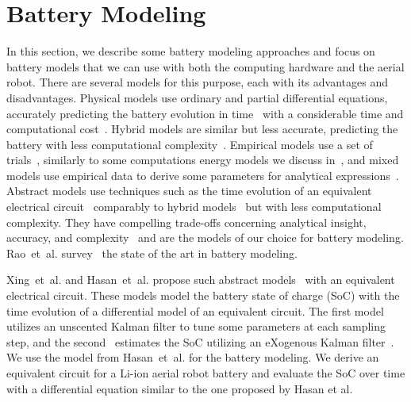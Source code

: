 \section{Battery Modeling}
\label{sec:soa-ene-bat}

In this section, we describe some battery modeling approaches and focus on battery models that we can use with both the computing hardware and the aerial robot. There are several models for this purpose, each with its advantages and disadvantages. Physical models use ordinary and partial differential equations, accurately predicting the battery evolution in time~\citep{rao2003battery} with a considerable time and computational cost~\citep{doyle1993modeling,marcicki2013design,lotfi2017reduced,moura2017battery}. Hybrid models are similar but less accurate, predicting the battery with less computational complexity~\citep{kim2011hybrid,kim2019enhanced}. Empirical models use a set of trials~\citep{syracuse1997statistical,pedram1999design}, similarly to some computations energy models we discuss in~, and mixed models use empirical data to derive some parameters for analytical expressions~\citep{rao2003battery,rakhmatov2001analytical}. Abstract models use techniques such as the time evolution of an equivalent electrical circuit~\citep{gold1997pspice,benini2001discrete,seongjun2008state,xiaosong2012comparative,xing2014state,hasan2018exogenous} comparably to hybrid models~\citep{kim2011hybrid} but with less computational complexity. They have compelling trade-offs concerning analytical insight, accuracy, and complexity~\citep{rao2003battery} and are the models of our choice for battery modeling. Rao~et~al. survey~\citep{rao2003battery} the state of the art in battery modeling.

Xing~et~al. and Hasan~et~al. propose such abstract models~\citep{xing2014state,hasan2018exogenous} with an equivalent electrical circuit. These models model the battery state of charge (SoC) with the time evolution of a differential model of an equivalent circuit. The first model~\citep{xing2014state} utilizes an unscented Kalman filter to tune some parameters at each sampling step, and the second~\citep{hasan2018exogenous} estimates the SoC utilizing an eXogenous Kalman filter~\citep{johansen2017exogenous}. We use the model from Hasan~et~al. for the battery modeling. We derive an equivalent circuit for a Li-ion aerial robot battery and evaluate the SoC over time with a differential equation similar to the one proposed by Hasan et al.

